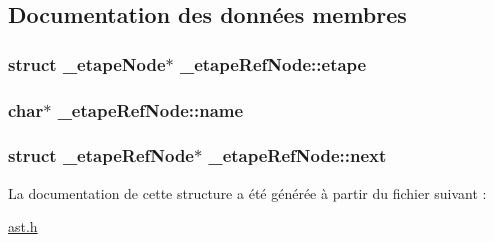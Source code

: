 \subsection{Documentation des données membres}
\hypertarget{struct__etapeRefNode_a86b5ed38aaa77c3d4dc11fe7386b20d4}{
\subsubsection[{etape}]{\setlength{\rightskip}{0pt plus 5cm}struct {\bf \-\_\-etape\-Node}$\ast$ \-\_\-etape\-Ref\-Node\-::etape}}\label{struct__etapeRefNode_a86b5ed38aaa77c3d4dc11fe7386b20d4}
\hypertarget{struct__etapeRefNode_a0b95dcf66124787e3da9d6038f3ac862}{
\subsubsection[{name}]{\setlength{\rightskip}{0pt plus 5cm}char$\ast$ \-\_\-etape\-Ref\-Node\-::name}}\label{struct__etapeRefNode_a0b95dcf66124787e3da9d6038f3ac862}
\hypertarget{struct__etapeRefNode_a3108538c22adec1b6d1c4b4c49b6abad}{
\subsubsection[{next}]{\setlength{\rightskip}{0pt plus 5cm}struct {\bf \-\_\-etape\-Ref\-Node}$\ast$ \-\_\-etape\-Ref\-Node\-::next}}\label{struct__etapeRefNode_a3108538c22adec1b6d1c4b4c49b6abad}


La documentation de cette structure a été générée à partir du fichier suivant \-:\begin{DoxyCompactItemize}
\item 
\hyperlink{ast_8h}{ast.\-h}\end{DoxyCompactItemize}
